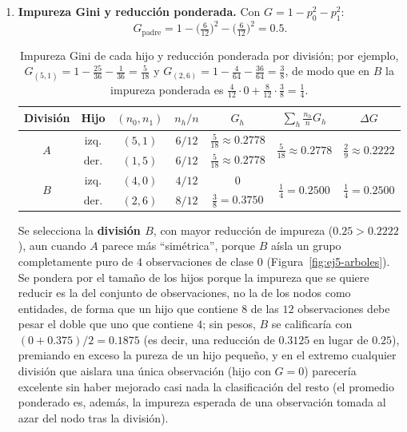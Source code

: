 \begin{enumerate}

\item \textbf{Impureza Gini y reducción ponderada.}
Con $G=1-p_0^2-p_1^2$:
\[
    G_{\text{padre}} = 1 - \bigl(\tfrac{6}{12}\bigr)^2 - \bigl(\tfrac{6}{12}\bigr)^2 = 0.5 .
\]
\begin{table}[H]
\centering
\begin{tabular}{ccccccc}
\toprule
División & Hijo & $(n_0,n_1)$ & $n_h/n$ & $G_h$ & $\sum_h \frac{n_h}{n}G_h$ & $\Delta G$ \\
\midrule
\multirow{2}{*}{$A$}
  & izq. & $(5,1)$ & $6/12$ & $\frac{5}{18}\approx0.2778$
  & \multirow{2}{*}{$\frac{5}{18}\approx0.2778$} & \multirow{2}{*}{$\frac{2}{9}\approx0.2222$} \\
  & der. & $(1,5)$ & $6/12$ & $\frac{5}{18}\approx0.2778$ & & \\
\midrule
\multirow{2}{*}{$B$}
  & izq. & $(4,0)$ & $4/12$ & $0$
  & \multirow{2}{*}{$\frac14=0.2500$} & \multirow{2}{*}{$\frac14=\mathbf{0.2500}$} \\
  & der. & $(2,6)$ & $8/12$ & $\frac38=0.3750$ & & \\
\bottomrule
\end{tabular}
\caption{Impureza Gini de cada hijo y reducción ponderada por división;
por ejemplo, $G_{(5,1)}=1-\frac{25}{36}-\frac{1}{36}=\frac{5}{18}$ y
$G_{(2,6)}=1-\frac{4}{64}-\frac{36}{64}=\frac{3}{8}$, de modo que en $B$
la impureza ponderada es $\frac{4}{12}\cdot0+\frac{8}{12}\cdot\frac38=\frac14$.}
\label{tab:ej5-gini}
\end{table}

Se selecciona la \textbf{división $B$}, con mayor reducción de impureza
($0.25>0.2222$), aun cuando $A$ parece más ``simétrica'', porque $B$
aísla un grupo completamente puro de $4$ observaciones de clase $0$
(Figura~\ref{fig:ej5-arboles}). Se
pondera por el tamaño de los hijos porque la impureza que se quiere
reducir es la del conjunto de observaciones, no la de los nodos como
entidades, de forma que un hijo que contiene $8$ de las $12$
observaciones debe pesar el doble que uno que contiene $4$; sin pesos,
$B$ se calificaría con $(0+0.375)/2=0.1875$ (es decir, una reducción de
$0.3125$ en lugar de $0.25$), premiando en exceso la
pureza de un hijo pequeño, y en el extremo cualquier división que
aislara una única observación (hijo con $G=0$) parecería excelente sin
haber mejorado casi nada la clasificación del resto (el promedio
ponderado es, además, la impureza esperada de una observación tomada al
azar del nodo tras la división).


\end{enumerate}
